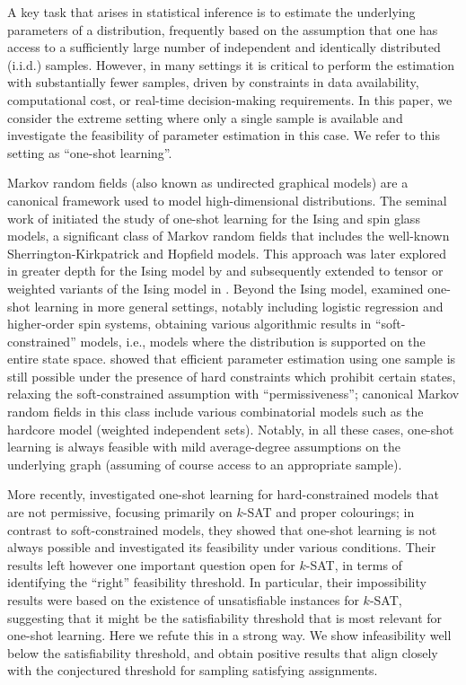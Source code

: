 \documentclass[11pt]{article}
\theoremstyle{definition}
\theoremstyle{remark}
\begin{document}
A key task that arises in statistical inference is to estimate the underlying parameters of a distribution, frequently based on the assumption that one has access to a sufficiently large number of independent and identically distributed (i.i.d.) samples. However, in many settings it is critical to perform the estimation with substantially fewer samples,  driven by constraints in data availability, computational cost, or real-time decision-making requirements. In this paper, we consider the extreme setting where only a single sample is available and investigate the feasibility of parameter estimation in this case. We refer to this setting as ``one-shot learning''.

 


    
        
Markov random fields (also known as undirected graphical models) are a canonical framework used to model high-dimensional distributions. The seminal work of \cite{Chatterjee07c} initiated the study of one-shot learning for the Ising and spin glass models, a significant class of Markov random fields that includes the well-known Sherrington-Kirkpatrick and Hopfield models. This approach was later explored in greater depth for the 
Ising model by \cite{BM18} and subsequently extended to tensor or weighted variants of the Ising model in \cite{GM20, MSB, DDDVK21}.
 Beyond the Ising model,  \cite{DDK19, DDP20}  examined one-shot learning in more general settings, notably including logistic regression and higher-order spin systems, obtaining  various algorithmic results in ``soft-constrained''  models, i.e., models where the distribution is supported on the entire state space. \cite{BR21} showed that efficient parameter estimation using one sample is still possible under the presence of hard constraints which prohibit certain states,  relaxing the soft-constrained assumption with ``permissiveness''; canonical Markov random fields in this class include various combinatorial models such as the hardcore model (weighted independent sets). Notably, in all these cases, one-shot learning is always feasible with mild average-degree assumptions on the underlying graph (assuming of course access to an appropriate sample).

More recently, \cite{GKK24} investigated one-shot learning for hard-constrained models that are not permissive, focusing primarily on $k$-SAT and proper colourings; in contrast to soft-constrained models, they showed that one-shot learning is not always possible and investigated its feasibility under various conditions. Their results left however one important question open for $k$-SAT, in terms of identifying the ``right'' feasibility threshold. In particular, their impossibility results were based on the existence of unsatisfiable instances for $k$-SAT, suggesting  that  it might be the satisfiability threshold that is most relevant for one-shot learning. Here we refute this in a strong way. We show infeasibility well below the satisfiability threshold, and obtain positive results that align closely with the conjectured threshold for sampling satisfying assignments.
\end{document}
